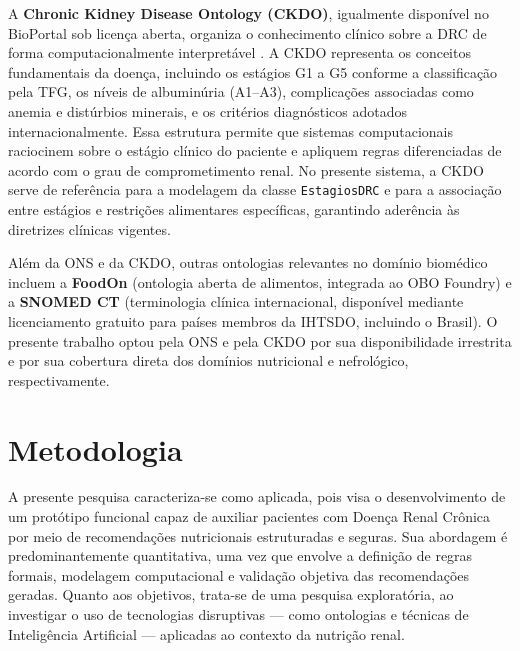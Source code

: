 \documentclass[12pt, a4paper, twocolumn]{article}
\begin{document}
A \textbf{Chronic Kidney Disease Ontology (CKDO)}, igualmente disponível no BioPortal sob licença aberta, organiza o conhecimento clínico sobre a DRC de forma computacionalmente interpretável \cite{ckdo}. A CKDO representa os conceitos fundamentais da doença, incluindo os estágios G1 a G5 conforme a classificação pela TFG, os níveis de albuminúria (A1--A3), complicações associadas como anemia e distúrbios minerais, e os critérios diagnósticos adotados internacionalmente. Essa estrutura permite que sistemas computacionais raciocinem sobre o estágio clínico do paciente e apliquem regras diferenciadas de acordo com o grau de comprometimento renal. No presente sistema, a CKDO serve de referência para a modelagem da classe \texttt{EstagiosDRC} e para a associação entre estágios e restrições alimentares específicas, garantindo aderência às diretrizes clínicas vigentes.

Além da ONS e da CKDO, outras ontologias relevantes no domínio biomédico incluem a \textbf{FoodOn} (ontologia aberta de alimentos, integrada ao OBO Foundry) e a \textbf{SNOMED CT} (terminologia clínica internacional, disponível mediante licenciamento gratuito para países membros da IHTSDO, incluindo o Brasil). O presente trabalho optou pela ONS e pela CKDO por sua disponibilidade irrestrita e por sua cobertura direta dos domínios nutricional e nefrológico, respectivamente.

\section{Metodologia}

A presente pesquisa caracteriza-se como aplicada, pois visa o desenvolvimento de um protótipo funcional capaz de auxiliar pacientes com Doença Renal Crônica por meio de recomendações nutricionais estruturadas e seguras. Sua abordagem é predominantemente quantitativa, uma vez que envolve a definição de regras formais, modelagem computacional e validação objetiva das recomendações geradas. Quanto aos objetivos, trata-se de uma pesquisa exploratória, ao investigar o uso de tecnologias disruptivas --- como ontologias e técnicas de Inteligência Artificial --- aplicadas ao contexto da nutrição renal.
\end{document}
